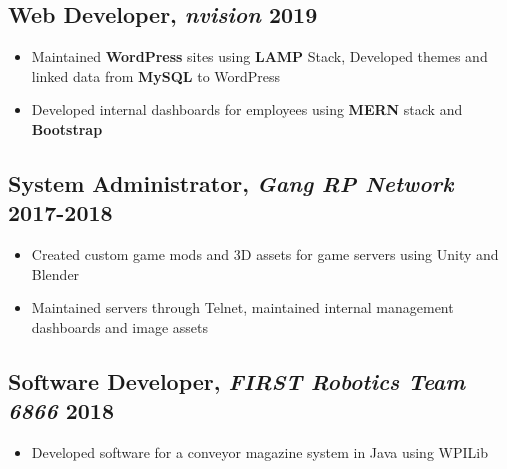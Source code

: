 \documentclass{article}
\begin{document}
\subsection{Web Developer, \textit{nvision} \hfill \normalsize\textnormal{2019}}
\begin{itemize}
    \item Maintained \textbf{WordPress} sites using \textbf{LAMP} Stack, Developed themes and linked data from \textbf{MySQL} to WordPress
    \item Developed internal dashboards for employees using \textbf{MERN} stack and \textbf{Bootstrap} 
\end{itemize}

\subsection{System Administrator, \textit{Gang RP Network} \hfill \normalsize\textnormal{2017-2018}}
\begin{itemize}
    \item Created custom game mods and 3D assets for game servers using Unity and Blender
    \item Maintained servers through Telnet, maintained internal management dashboards and image assets
\end{itemize}

\subsection{Software Developer, \textit{FIRST Robotics Team 6866} \hfill \normalsize\textnormal{2018}}
\begin{itemize}
    \item Developed software for a conveyor magazine system in Java using WPILib
\end{itemize}


\end{document}
